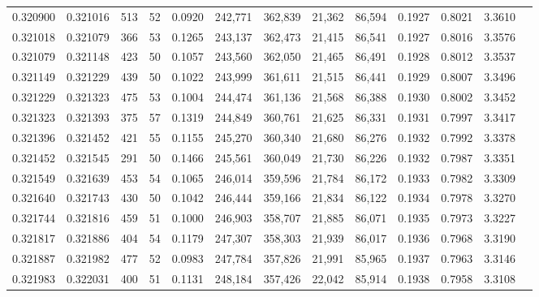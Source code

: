 \begin{tabular}{rrrrrrrrrrrrr}
0.320900 & 0.321016 &   513 &  52 &                                     0.0920 & 242,771 & 362,839 &  21,362 &  86,594 & 0.1927 & 0.8021 & 3.3610 \\
0.321018 & 0.321079 &   366 &  53 &                                     0.1265 & 243,137 & 362,473 &  21,415 &  86,541 & 0.1927 & 0.8016 & 3.3576 \\
0.321079 & 0.321148 &   423 &  50 &                                     0.1057 & 243,560 & 362,050 &  21,465 &  86,491 & 0.1928 & 0.8012 & 3.3537 \\
0.321149 & 0.321229 &   439 &  50 &                                     0.1022 & 243,999 & 361,611 &  21,515 &  86,441 & 0.1929 & 0.8007 & 3.3496 \\
0.321229 & 0.321323 &   475 &  53 &                                     0.1004 & 244,474 & 361,136 &  21,568 &  86,388 & 0.1930 & 0.8002 & 3.3452 \\
0.321323 & 0.321393 &   375 &  57 &                                     0.1319 & 244,849 & 360,761 &  21,625 &  86,331 & 0.1931 & 0.7997 & 3.3417 \\
0.321396 & 0.321452 &   421 &  55 &                                     0.1155 & 245,270 & 360,340 &  21,680 &  86,276 & 0.1932 & 0.7992 & 3.3378 \\
0.321452 & 0.321545 &   291 &  50 &                                     0.1466 & 245,561 & 360,049 &  21,730 &  86,226 & 0.1932 & 0.7987 & 3.3351 \\
0.321549 & 0.321639 &   453 &  54 &                                     0.1065 & 246,014 & 359,596 &  21,784 &  86,172 & 0.1933 & 0.7982 & 3.3309 \\
0.321640 & 0.321743 &   430 &  50 &                                     0.1042 & 246,444 & 359,166 &  21,834 &  86,122 & 0.1934 & 0.7978 & 3.3270 \\
0.321744 & 0.321816 &   459 &  51 &                                     0.1000 & 246,903 & 358,707 &  21,885 &  86,071 & 0.1935 & 0.7973 & 3.3227 \\
0.321817 & 0.321886 &   404 &  54 &                                     0.1179 & 247,307 & 358,303 &  21,939 &  86,017 & 0.1936 & 0.7968 & 3.3190 \\
0.321887 & 0.321982 &   477 &  52 &                                     0.0983 & 247,784 & 357,826 &  21,991 &  85,965 & 0.1937 & 0.7963 & 3.3146 \\
0.321983 & 0.322031 &   400 &  51 &                                     0.1131 & 248,184 & 357,426 &  22,042 &  85,914 & 0.1938 & 0.7958 & 3.3108 \\

\end{tabular}
